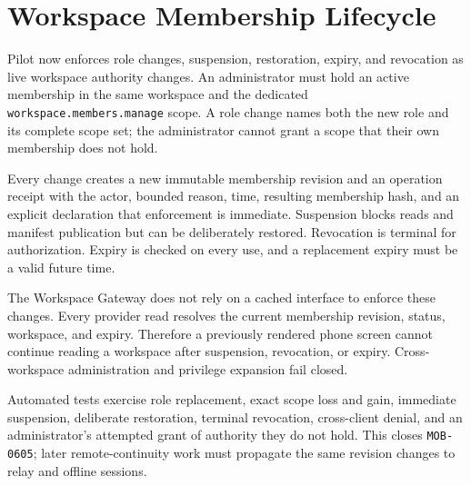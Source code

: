 \section{Workspace Membership Lifecycle}
\label{sec:pilot-mobile-workspace-membership-lifecycle}
\raggedright

Pilot now enforces role changes, suspension, restoration, expiry, and revocation as live
workspace authority changes.  An administrator must hold an active membership in the
same workspace and the dedicated \texttt{workspace.members.manage} scope.  A role change
names both the new role and its complete scope set; the administrator cannot grant a
scope that their own membership does not hold.

Every change creates a new immutable membership revision and an operation receipt with
the actor, bounded reason, time, resulting membership hash, and an explicit declaration
that enforcement is immediate.  Suspension blocks reads and manifest publication but
can be deliberately restored.  Revocation is terminal for authorization.  Expiry is
checked on every use, and a replacement expiry must be a valid future time.

The Workspace Gateway does not rely on a cached interface to enforce these changes.
Every provider read resolves the current membership revision, status, workspace, and
expiry.  Therefore a previously rendered phone screen cannot continue reading a
workspace after suspension, revocation, or expiry.  Cross-workspace administration and
privilege expansion fail closed.

Automated tests exercise role replacement, exact scope loss and gain, immediate
suspension, deliberate restoration, terminal revocation, cross-client denial, and an
administrator's attempted grant of authority they do not hold.  This closes
\texttt{MOB-0605}; later remote-continuity work must propagate the same revision changes
to relay and offline sessions.


